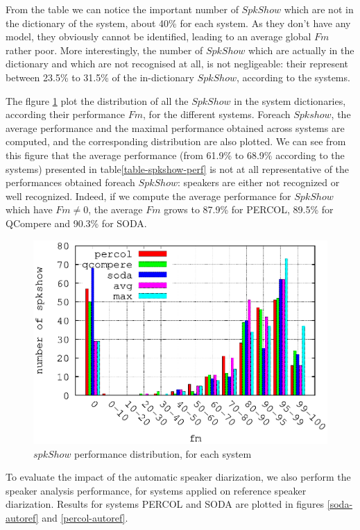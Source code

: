 From the table we can notice the important number of $SpkShow$ which are not in the dictionary of the system, about 40\% for each system. As they don't have any model, they obviously cannot be identified, leading to an average global $Fm$ rather poor. More interestingly, the number of $SpkShow$ which are actually in the dictionary and which are not recognised at all, is not negligeable: their represent between 23.5\% to 31.5\% of the in-dictionary $SpkShow$, according to the systems.


The flgure \ref{PQS} plot the distribution of all the $SpkShow$ in the system dictionaries, according their performance $Fm$, for the different systems. Foreach $Spkshow$, the average performance and the maximal performance obtained across systems are computed, and the corresponding distribution are also plotted. We can see from this figure that the average performance (from 61.9\% to 68.9\% according to the systems) presented in table\ref{table-spkshow-perf} is not at all representative of the performances obtained foreach $SpkShow$: speakers are either not recognized or well recognized. Indeed, if we compute the average performance for $SpkShow$ which have $Fm \neq 0$, the average $Fm$ grows to 87.9\% for PERCOL, 89.5\% for QCompere and 90.3\% for SODA. 

\begin{figure}[!h]
\includegraphics[scale=0.6]{PQS-mono-model.eps}
\caption{$spkShow$ performance distribution, for each system}
\label{PQS}
\end{figure}

To evaluate the impact of the automatic speaker diarization, we also perform the speaker analysis performance, for systems applied on reference speaker diarization. Results for systems PERCOL and SODA are plotted in figures \ref{soda-autoref} and \ref{percol-autoref}.  


